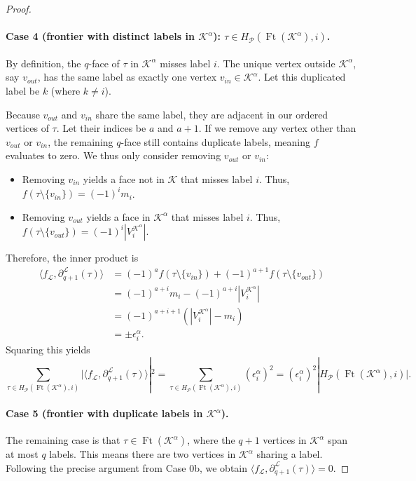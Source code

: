 \documentclass{article}
\newcommand{\KK}{\mathcal{K}}
\newcommand{\LL}{\mathcal{L}}
\newcommand{\Ft}{\operatorname{Ft}}
\begin{document}
\begin{proof}
\paragraph{Case 4 (frontier with distinct labels in $\KK^\alpha$): $\tau\in H_{\mathcal{P}}(\Ft(\KK^\alpha), i)$.}
By definition, the $q$-face of $\tau$ in $\KK^\alpha$ misses label $i$. The unique vertex outside $\KK^\alpha$, say $v_{out}$, has the same label as exactly one vertex $v_{in} \in \KK^\alpha$. Let this duplicated label be $k$ (where $k \neq i$).

Because $v_{out}$ and $v_{in}$ share the same label, they are adjacent in our ordered vertices of $\tau$. Let their indices be $a$ and $a+1$. If we remove any vertex other than $v_{out}$ or $v_{in}$, the remaining $q$-face still contains duplicate labels, meaning $f$ evaluates to zero. We thus only consider removing $v_{out}$ or $v_{in}$:
\begin{itemize}
    \item Removing $v_{in}$ yields a face not in $\KK$ that misses label $i$. Thus, $f(\tau \setminus \{v_{in}\}) = (-1)^i m_i$.
    \item Removing $v_{out}$ yields a face in $\KK^\alpha$ that misses label $i$. Thus, $f(\tau \setminus \{v_{out}\}) = (-1)^i |V^{\KK^\alpha}_i|$.
\end{itemize}
Therefore, the inner product is
\begin{align*}
\langle f_\LL, \partial_{q+1}^\LL(\tau)\rangle 
&= (-1)^a f(\tau \setminus \{v_{in}\}) + (-1)^{a+1} f(\tau \setminus \{v_{out}\}) \\
&= (-1)^{a+i} m_i - (-1)^{a+i} |V^{\KK^\alpha}_i| \\
&= (-1)^{a+i+1} (|V^{\KK^\alpha}_i| - m_i) \\
&= \pm \epsilon_i^\alpha.
\end{align*}
Squaring this yields
\[
\sum_{\tau\in H_{\mathcal{P}}(\Ft(\KK^\alpha), i)}\big|\langle f_\LL, \partial_{q+1}^\LL(\tau)\rangle|^2
= \sum_{\tau\in H_\mathcal{P}(\Ft(\KK^\alpha),i)} (\epsilon_i^\alpha)^2 
= (\epsilon_i^\alpha)^2 |H_{\mathcal{P}}(\Ft(\KK^\alpha), i)|.
\]

\paragraph{Case 5 (frontier with duplicate labels in $\KK^\alpha$).}
The remaining case is that $\tau\in \Ft(\KK^\alpha)$, where the $q+1$ vertices in $\KK^\alpha$ span at most $q$ labels. This means there are two vertices in $\KK^\alpha$ sharing a label. Following the precise argument from Case 0b, we obtain $\langle f_\LL,\partial_{q+1}^\LL(\tau)\rangle = 0$.


\end{proof}
\end{document}
